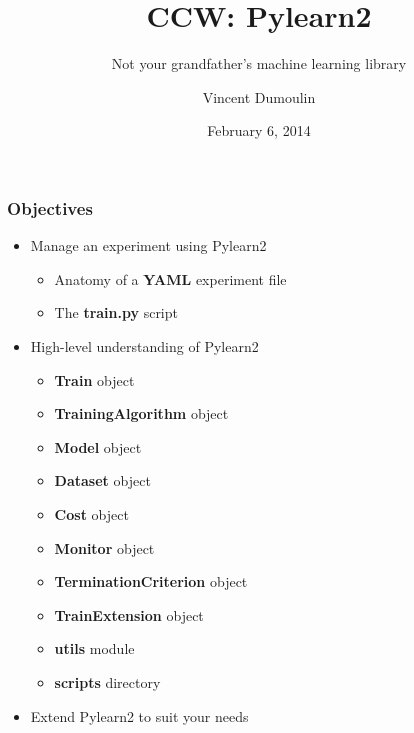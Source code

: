 \documentclass[mathserif, xcolor=dvipsnames]{beamer}
\title{CCW: Pylearn2}
\subtitle{Not your grandfather's machine learning library}
\author{Vincent Dumoulin}
\date{February 6, 2014}
\begin{document}


\begin{frame}[plain]
    \titlepage
\end{frame}

\begin{frame}
    \frametitle{Objectives}
    \begin{itemize}\addtolength{\itemsep}{0.5\baselineskip}
        \item{
            {\Large Manage an experiment using Pylearn2}
            \begin{itemize}
                \item{Anatomy of a \textbf{YAML} experiment file}
                \item{The \textbf{train.py} script}
            \end{itemize}
        }
        \item{
            {\Large High-level understanding of Pylearn2}
            \begin{itemize}
                \item{\textbf{Train} object}
                \item{\textbf{TrainingAlgorithm} object}
                \item{\textbf{Model} object}
                \item{\textbf{Dataset} object}
                \item{\textbf{Cost} object}
                \item{\textbf{Monitor} object}
                \item{\textbf{TerminationCriterion} object}
                \item{\textbf{TrainExtension} object}
                \item{\textbf{utils} module}
                \item{\textbf{scripts} directory}
            \end{itemize}
        }
        \item{
            {\Large Extend Pylearn2 to suit your needs}
        }
    \end{itemize}
\end{frame}
\end{document}
